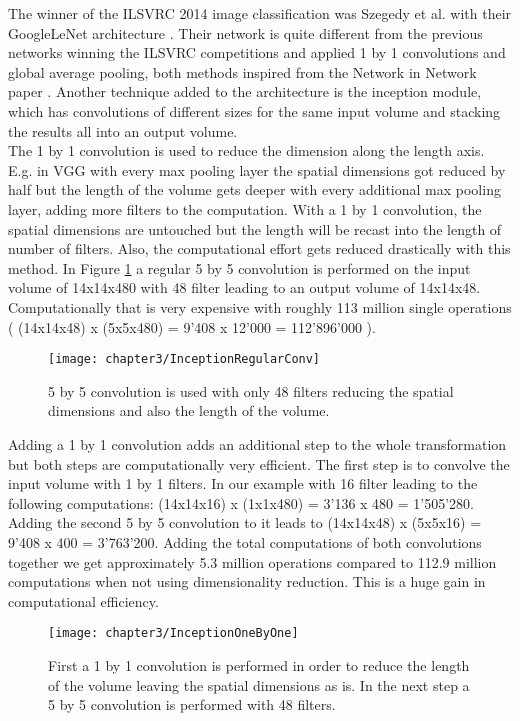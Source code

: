 The winner of the ILSVRC 2014 image classification was Szegedy et al. with their GoogleLeNet architecture \cite{szegedy2015going}. Their network is quite different from the previous networks winning the ILSVRC competitions and applied 1 by 1 convolutions and global average pooling, both methods inspired from the Network in Network paper \cite{lin2013network}. Another technique added to the architecture is the inception module, which has convolutions of different sizes for the same input volume and stacking the results all into an output volume. \\

The 1 by 1 convolution is used to reduce the dimension along the length axis. E.g. in VGG with every max pooling layer the spatial dimensions got reduced by half but the length of the volume gets deeper with every additional max pooling layer, adding more filters to the computation. With a 1 by 1 convolution, the spatial dimensions are untouched but the length will be recast into the length of number of filters. Also, the computational effort gets reduced drastically with this method. In Figure \ref{fig:InceptionRegularConv} a regular 5 by 5 convolution is performed on the input volume of 14x14x480 with 48 filter leading to an output volume of 14x14x48. Computationally that is very expensive with roughly 113 million single operations ( (14x14x48) x (5x5x480) = 9'408 x 12'000 = 112'896'000 ).

\begin{figure}[H]
  \centering
  \caption{5 by 5 convolution is used with only 48 filters reducing the spatial dimensions and also the length of the volume. \cite{ReviewGoogleLeNetv1}}
  \texttt{[image: chapter3/InceptionRegularConv]}
  \label{fig:InceptionRegularConv}
\end{figure}

Adding a 1 by 1 convolution adds an additional step to the whole transformation but both steps are computationally very efficient. The first step is to convolve the input volume with 1 by 1 filters. In our example with 16 filter leading to the following computations: (14x14x16) x (1x1x480) = 3'136 x 480 = 1'505'280. Adding the second 5 by 5 convolution to it leads to (14x14x48) x (5x5x16) = 9'408 x 400 = 3'763'200. Adding the total computations of both convolutions together we get approximately 5.3 million operations compared to 112.9 million computations when not using dimensionality reduction. This is a huge gain in computational efficiency.

\begin{figure}[H]
  \centering
  \caption{First a 1 by 1 convolution is performed in order to reduce the length of the volume leaving the spatial dimensions as is. In the next step a 5 by 5 convolution is performed with 48 filters. \cite{ReviewGoogleLeNetv1}}
  \texttt{[image: chapter3/InceptionOneByOne]}
  \label{fig:parameters}
\end{figure}

